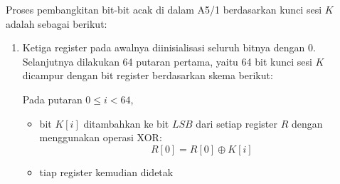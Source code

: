 \documentclass{article}
\begin{document}

Proses pembangkitan bit-bit acak di dalam A5/1 berdasarkan kunci sesi $K$ adalah sebagai berikut:

\begin{enumerate}
    \item Ketiga register pada awalnya diinisialisasi seluruh bitnya dengan 0. Selanjutnya dilakukan 64 putaran pertama, yaitu 64 bit kunci sesi $K$ dicampur dengan bit register berdasarkan skema berikut:
    
    Pada putaran $0 \le i < 64$,
    \begin{itemize}
        \item bit $K[i]$ ditambahkan ke bit $LSB$ dari setiap register $R$ dengan menggunakan operasi XOR:
        \[ R[0] = R[0] \oplus K[i] \]
        \item tiap register kemudian didetak
    \end{itemize}
\end{enumerate}
\end{document}
